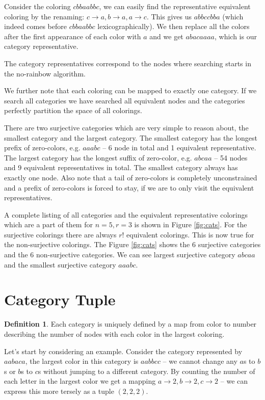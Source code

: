 \documentclass{book}
\theoremstyle{definition}
\newtheorem{definition}{Definition}[section]
\begin{document}
Consider the coloring $cbbaabbc$, we can easily find the representative equivalent coloring by the renaming: $c \rightarrow a, b \rightarrow a, a \rightarrow c$. This gives us $abbccbba$ (which indeed comes before $cbbaabbc$ lexicographically). We then replace all the colors after the first appearance of each color with $a$ and we get $abacaaaa$, which is our category representative.

The category representatives correspond to the nodes where searching starts in the no-rainbow algorithm.

We further note that each coloring can be mapped to exactly one category. If we search all categories we have searched all equivalent nodes and the categories perfectly partition the space of all colorings.

There are two surjective categories which are very simple to reason about, the smallest category and the largest category. The smallest category has the longest prefix of zero-colors, e.g. $aaabc$ -- 6 node in total and 1 equivalent representative. The largest category has the longest suffix of zero-color, e.g. $abcaa$ -- 54 nodes and 9 equivalent representatives in total. The smallest category always has exactly one node. Also note that a tail of zero-colors is completely unconstrained and a prefix of zero-colors is forced to stay, if we are to only visit the equivalent representatives.

A complete listing of all categories and the equivalent representative colorings which are a part of them for $n=5, r=3$ is shown in Figure \ref{fig:cats}. For the surjective colorings there are always $r!$ equivalent colorings. This is now true for the non-surjective colorings. The Figure \ref{fig:cats} shows the 6 surjective categories and the 6 non-surjective categories. We can see largest surjective category $abcaa$ and the smallest surjective category $aaabc$.

\section{Category Tuple} \label{sec:cat-tup}
\begin{definition}
  Each category is uniquely defined by a map from color to number describing the number of nodes with each color in the largest coloring.
\end{definition}
Let's start by considering an example. Consider the category represented by $aabaca$, the largest color in this category is $aabbcc$ -- we cannot change any $a$s to $b$s or $b$s to $c$s without jumping to a different category. By counting the number of each letter in the largest color we get a mapping $a \rightarrow 2, b \rightarrow 2, c \rightarrow 2$ -- we can express this more tersely as a tuple $(2, 2, 2)$. 
\end{document}
